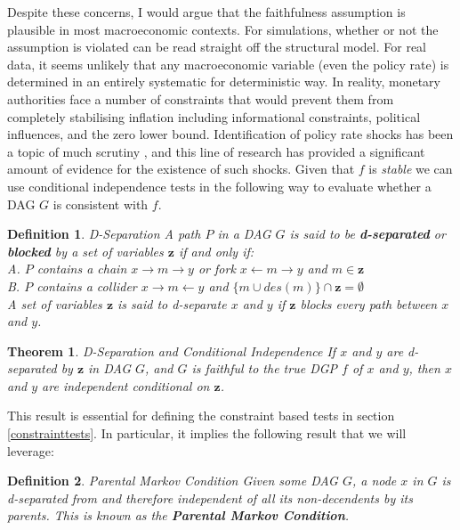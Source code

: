 \documentclass{article}
\newtheorem{definition}{Definition}
\newtheorem{theorem}{Theorem}
\begin{document}
Despite these concerns, I would argue that the faithfulness assumption is plausible in most macroeconomic contexts. For simulations, whether or not the assumption is violated can be read straight off the structural model. For real data, it seems unlikely that any macroeconomic variable (even the policy rate) is determined in an entirely systematic for deterministic way. In reality, monetary authorities face a number of constraints that would prevent them from completely stabilising inflation including informational constraints, political influences, and the zero lower bound. Identification of policy rate shocks has been a topic of much scrutiny \parencite{ramey2016handbook}, and this line of research has provided a significant amount of evidence for the existence of such shocks. Given that $f$ is \textit{stable} we can use conditional independence tests in the following way to evaluate whether a DAG $G$ is consistent with $f$.

\begin{definition}{D-Separation}
  A path $P$ in a DAG $G$ is said to be \textbf{d-separated} or \textbf{blocked} by a set of variables $\mathbf{z}$ if and only if: \\
  A. $P$ contains a chain $x \rightarrow m \rightarrow y$ or fork $x \leftarrow m \rightarrow y$ and $m \in \mathbf{z}$ \\
  B. $P$ contains a collider $x \rightarrow m \leftarrow y$ and $\{m \cup des(m)\} \cap \mathbf{z} = \emptyset$ \\
  A set of variables $\mathbf{z}$ is said to \textit{d-separate} $x$ and $y$ if $\mathbf{z}$ blocks every path between $x$ and $y$.
  \parencite[p.16]{pearl2009causality}
  \label{dseparation}
\end{definition}

\theoremstyle{theorem}
\begin{theorem}{D-Separation and Conditional Independence}
  If $x$ and $y$ are d-separated by $\mathbf{z}$ in DAG $G$, and $G$ is faithful to the true DGP $f$ of $x$ and $y$, then $x$ and $y$ are independent conditional on $\mathbf{z}$. 
  \parencite[p.16]{pearl2009causality}
  \label{dseptheorem}
\end{theorem}

This result is essential for defining the constraint based tests in section \ref{constrainttests}. In particular, it implies the following result that we will leverage:

\theoremstyle{corollary}
\begin{definition}{Parental Markov Condition}
  Given some DAG $G$, a node $x$ in $G$ is d-separated from and therefore independent of all its non-decendents by its parents. This is known as the \textbf{Parental Markov Condition}. 
  \parencite[p.16, p.19]{pearl2009causality}
  \label{markovcompatibility}
\end{definition}
\end{document}
